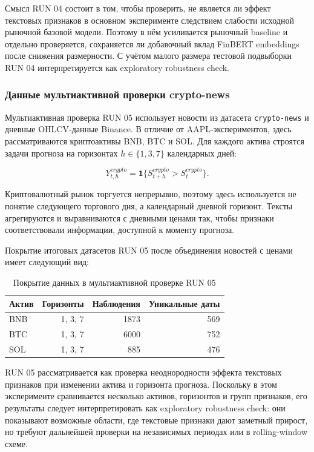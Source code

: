 Смысл RUN 04 состоит в том, чтобы проверить, не является ли эффект текстовых признаков в основном эксперименте следствием слабости исходной рыночной базовой модели. Поэтому в нём усиливается рыночный baseline и отдельно проверяется, сохраняется ли добавочный вклад FinBERT embeddings после снижения размерности. С учётом малого размера тестовой подвыборки RUN 04 интерпретируется как exploratory robustness check.

\subsubsection{Данные мультиактивной проверки crypto-news}

Мультиактивная проверка RUN 05 использует новости из датасета \texttt{crypto-news} и дневные OHLCV-данные Binance. В отличие от AAPL-экспериментов, здесь рассматриваются криптоактивы BNB, BTC и SOL. Для каждого актива строятся задачи прогноза на горизонтах $h \in \{1,3,7\}$ календарных дней:

\[
Y_{t,h}^{crypto}=\mathbf{1}\{S_{t+h}^{crypto}>S_t^{crypto}\}.
\]

Криптовалютный рынок торгуется непрерывно, поэтому здесь используется не понятие следующего торгового дня, а календарный дневной горизонт. Тексты агрегируются и выравниваются с дневными ценами так, чтобы признаки соответствовали информации, доступной к моменту прогноза.

Покрытие итоговых датасетов RUN 05 после объединения новостей с ценами имеет следующий вид:

\begin{table}[H]
\centering
\begin{tabular}{lrrr}
\toprule
Актив & Горизонты & Наблюдения & Уникальные даты \\
\midrule
BNB & 1, 3, 7 & 1873 & 569 \\
BTC & 1, 3, 7 & 6000 & 752 \\
SOL & 1, 3, 7 & 885 & 476 \\
\bottomrule
\end{tabular}
\caption{Покрытие данных в мультиактивной проверке RUN 05}
\label{tab:run05_data_overview}
\end{table}

RUN 05 рассматривается как проверка неоднородности эффекта текстовых признаков при изменении актива и горизонта прогноза. Поскольку в этом эксперименте сравнивается несколько активов, горизонтов и групп признаков, его результаты следует интерпретировать как exploratory robustness check: они показывают возможные области, где текстовые признаки дают заметный прирост, но требуют дальнейшей проверки на независимых периодах или в rolling-window схеме.
